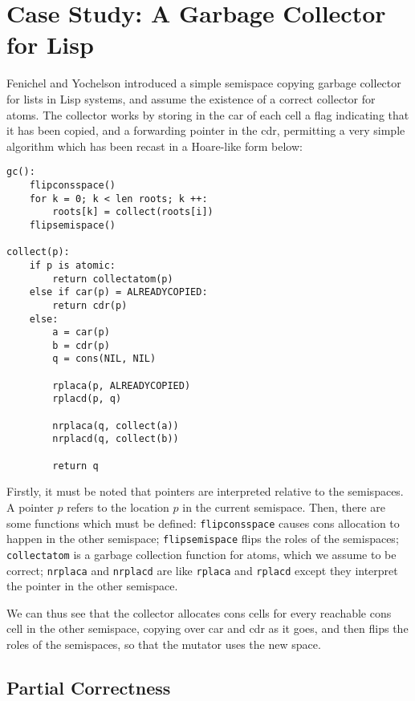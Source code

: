 \section{Case Study: A Garbage Collector for Lisp}
\label{sec:copying-example}

Fenichel and Yochelson\cite{Fenichel69} introduced a simple semispace
copying garbage collector for lists in Lisp systems, and assume the
existence of a correct collector for atoms. The collector works by
storing in the car of each cell a flag indicating that it has been
copied, and a forwarding pointer in the cdr, permitting a very simple
algorithm which has been recast in a Hoare-like form below:

\begin{lstlisting}
gc():
    flipconsspace()
    for k = 0; k < len roots; k ++:
        roots[k] = collect(roots[i])
    flipsemispace()

collect(p):
    if p is atomic:
        return collectatom(p)
    else if car(p) = ALREADYCOPIED:
        return cdr(p)
    else:
        a = car(p)
        b = cdr(p)
        q = cons(NIL, NIL)

        rplaca(p, ALREADYCOPIED)
        rplacd(p, q)

        nrplaca(q, collect(a))
        nrplacd(q, collect(b))

        return q
\end{lstlisting}

Firstly, it must be noted that pointers are interpreted relative to
the semispaces. A pointer $p$ refers to the location $p$ in the
current semispace. Then, there are some functions which must be
defined: \texttt{flipconsspace} causes cons allocation to happen in
the other semispace; \texttt{flipsemispace} flips the roles of the
semispaces; \texttt{collectatom} is a garbage collection function for
atoms, which we assume to be correct; \texttt{nrplaca} and
\texttt{nrplacd} are like \texttt{rplaca} and \texttt{rplacd} except
they interpret the pointer in the other semispace.

We can thus see that the collector allocates cons cells for every
reachable cons cell in the other semispace, copying over car and cdr
as it goes, and then flips the roles of the semispaces, so that the
mutator uses the new space.

\subsection{Partial Correctness}
\label{sec:copying-example-partial}

